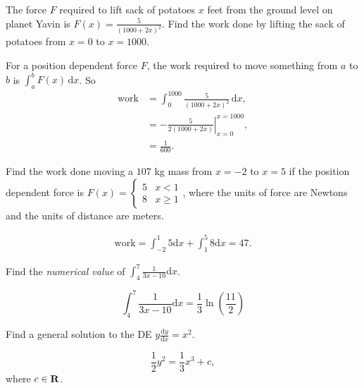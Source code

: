 \documentclass[12pt,fleqn,answers]{exam}
\begin{document}
\begin{questions}

\question The force $F$ required to lift sack of potatoes $x$ feet from the ground level on planet Yavin is
$F(x) = \frac{5}{(1000 + 2 x)^2}$. Find the work done by lifting the sack of potatoes from $x=0$ to $x=1000$.
\begin{solution}[3.0in] 
  For a position dependent force $F$, the work required to move something from
  $a$ to $b$ is $\int_a^b F(x) \,\mathrm{d} x$. So
  \begin{align*}
  \mbox{work} &= \int_0^{1000} \frac{5}{(1000 + 2 x)^2} \, \mathrm{d} x, \\
              &= - \left. \frac{5}{2 (1000 + 2 x)} \right|_{x=0}^{x=1000}, \\
              &= \frac{1}{600}.
  \end{align*}
 
\end{solution}

\question [5] Find the work done moving a $107$ kg mass from $x= -2 $ to $x =5$ if 
the position dependent force is $F(x)= \begin{cases} 5 & x < 1 \\ 8 & x \geq 1 
\end{cases}$, where
the units of force are Newtons and the units of distance are meters.
\begin{solution}[3.0in] 
\begin{align*}
\mbox{work} = \int_{-2}^1 5 \mathrm{d}x + \int_{1}^5 8 \mathrm{d}x
   = 47.
\end{align*}
\end{solution}

\question[5]  Find the \emph{numerical   value} of  \(\displaystyle  \int_4^7 \frac{1}{3 x - 10} \mathrm{d} x \).   
\begin{solution}%
\[
    \int_4^7 \frac{1}{3 x - 10} \mathrm{d} x = \frac{1}{3}
     \ln\left(\frac{11}{2}\right)
\]
\end{solution}

\newpage

\question[5] Find a general solution to the DE \(\displaystyle y \frac{\mathrm{d} y}{\mathrm{d} x} = x^2  \).

\begin{solution}[2.5in]
 \[ \frac{1}{2} y^2 =  \frac{1}{3} x^3  + c,\]
 where $c \in \mathbf{R}$.
\end{solution}




\end{questions}
\end{document}
